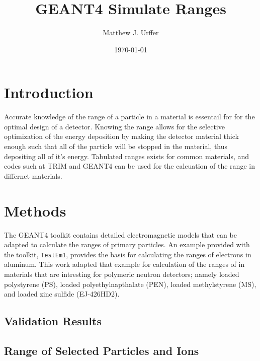 \documentclass[draftcls,onecolumn]{IEEEtran}
\begin{document}
\title{GEANT4 Simulate Ranges}
\author{Matthew J. Urffer}
\date{\today}
\maketitle

\printnomenclature

\listoftodos
\tableofcontents
\listoffigures
\listoftables
\lstlistoflistings

\section{Introduction}
Accurate knowledge of the range of a particle in a material is essentail for for the optimal design of a detector.
Knowing the range allows for the selective optimization of the energy deposition by making the detector material thick enough such that all of the particle will be stopped in the material, thus depositing all of it's energy.
Tabulated ranges exists for common materials, and codes such at TRIM and GEANT4 can be used for the calcuation of the range in differnet materials\cite{berger_estar_2005}.

\section{Methods}
The GEANT4 toolkit contains detailed electromagnetic models that can be adapted to calculate the ranges of primary particles.
An example provided with the toolkit, \verb+TestEm1+, provides the basis for calculating the ranges of electrons in aluminum. 
This work adapted that example for calculation of the ranges of in materials that are intresting for polymeric neutron detectors; namely  loaded polystyrene (PS),  loaded polyethylnapthalate (PEN),  loaded methylstyrene (MS), and  loaded zinc sulfide (EJ-426HD2).


\subsection{Validation Results}
\label{sec:ValResults}

\subsection{Range of Selected Particles and Ions}
\label{sec:RangeResults}
\end{document}
